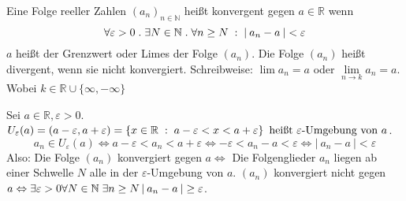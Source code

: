 \documentclass[a4paper,titlepage,oneside]{article}
\def\N{\ensuremath{\mathbb{N}} }
\def\R{\ensuremath{\mathbb{R}} }
\renewcommand{\epsilon}{\ensuremath{\varepsilon} }
\def\sp{\hspace{0,1cm}}
\def\spdot{\sp.\sp}
\def\spcolon{\sp:\sp}
\newcommand{\abs}[1]{\ensuremath{\left|\:#1\:\right|}}
\newcommand{\menge}[2]{\ensuremath{\left\{#1\sp : \sp #2\right\}}}
\theoremstyle{thmstyle}
\begin{document}
\begin{subdefi}
Eine Folge reeller Zahlen \((a_n)_{n\in\N}\) heißt konvergent gegen \( a\in\R\) wenn
\[\forall \epsilon > 0 \spdot \exists N \in \N \spdot \forall n \ge N \spcolon \abs{a_n - a} < \epsilon\]
\(a\) heißt der Grenzwert oder Limes der Folge \((a_n)\). Die Folge \((a_n)\) heißt divergent, wenn sie nicht konvergiert. Schreibweise: \(\lim{a_n} = a \) oder \( \lim\limits_{n \to k}{a_n} = a \). Wobei \( k \in \R\cup\{\infty, -\infty\}\)
\end{subdefi}

\begin{subbem}
Sei \(a \in \R, \epsilon > 0\). \(U_\epsilon(a) = (a-\epsilon, a+\epsilon) = \menge{x \in \R}{a - \epsilon < x < a + \epsilon} \text{ heißt } \epsilon\text{-Umgebung von }a\).
\[ a_n \in U_\epsilon(a) \Leftrightarrow a-\epsilon < a_n < a + \epsilon \Leftrightarrow -\epsilon < a_n - a < \epsilon \Leftrightarrow \abs{a_n - a} < \epsilon\]
Also: Die Folge \((a_n)\) konvergiert gegen \(a \Leftrightarrow \) Die Folgenglieder \(a_n\) liegen ab einer Schwelle \(N\) alle in der \(\epsilon\)-Umgebung von \(a\). \((a_n)\) konvergiert nicht gegen \(a \Leftrightarrow \exists \epsilon > 0 \forall N\in\N \sp \exists n \ge N \abs{a_n - a} \ge \epsilon\).
\end{subbem}
\end{document}
